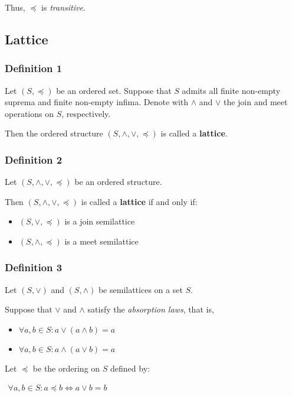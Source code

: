 Thus, $\preceq$ is \textit{transitive}.


\subsection{Lattice}
\label{sec:lattice}

\subsubsection{Definition 1}
Let $(S, \preceq)$ be an ordered set. Suppose that $S$ admits all
finite non-empty suprema and finite non-empty infima. Denote with
$\wedge$ and $\vee$ the join and meet operations on $S$, respectively.

Then the ordered structure $(S, \wedge, \vee, \preceq)$ is called a
\textbf{lattice}.

\subsubsection{Definition 2}

Let $(S, \wedge, \vee, \preceq)$ be an ordered structure.

Then $(S, \wedge, \vee, \preceq)$ is called a \textbf{lattice} if and
only if:

\begin{itemize}
\item $(S,\vee, \preceq)$ is a join semilattice
\item $(S,\wedge, \preceq)$ is a meet semilattice
\end{itemize}

\subsubsection{Definition 3}

Let $(S, \vee)$ and $(S, \wedge)$ be semilattices on a set $S$.

Suppose that $\vee$ and $\wedge$ satisfy the \textit{absorption laws}, that is,

\begin{itemize}
\item $\forall a, b \in S: a \vee (a \wedge b) = a$
\item $\forall a, b \in S: a \wedge (a \vee b) = a$
\end{itemize}

Let $\preceq$ be the ordering on $S$ defined by:

\begin{math}
  \begin{array}{c}
    \forall a, b \in S: a \preceq b \iff a \vee b = b
  \end{array}
\end{math}

